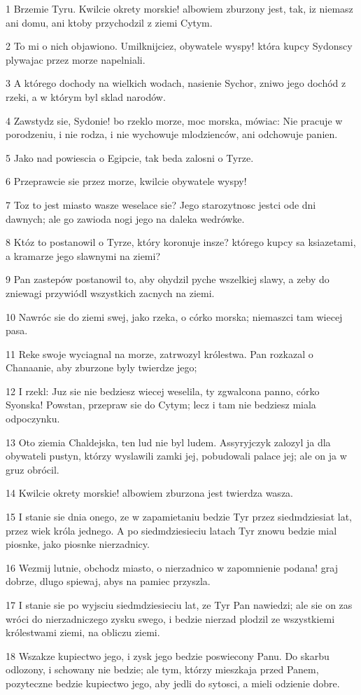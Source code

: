 \par 1 Brzemie Tyru. Kwilcie okrety morskie! albowiem zburzony jest, tak, iz niemasz ani domu, ani ktoby przychodzil z ziemi Cytym.
\par 2 To mi o nich objawiono. Umilknijciez, obywatele wyspy! która kupcy Sydonscy plywajac przez morze napelniali.
\par 3 A którego dochody na wielkich wodach, nasienie Sychor, zniwo jego dochód z rzeki, a w którym byl sklad narodów.
\par 4 Zawstydz sie, Sydonie! bo rzeklo morze, moc morska, mówiac: Nie pracuje w porodzeniu, i nie rodza, i nie wychowuje mlodzienców, ani odchowuje panien.
\par 5 Jako nad powiescia o Egipcie, tak beda zalosni o Tyrze.
\par 6 Przeprawcie sie przez morze, kwilcie obywatele wyspy!
\par 7 Toz to jest miasto wasze weselace sie? Jego starozytnosc jestci ode dni dawnych; ale go zawioda nogi jego na daleka wedrówke.
\par 8 Któz to postanowil o Tyrze, który koronuje insze? którego kupcy sa ksiazetami, a kramarze jego slawnymi na ziemi?
\par 9 Pan zastepów postanowil to, aby ohydzil pyche wszelkiej slawy, a zeby do zniewagi przywiódl wszystkich zacnych na ziemi.
\par 10 Nawróc sie do ziemi swej, jako rzeka, o córko morska; niemaszci tam wiecej pasa.
\par 11 Reke swoje wyciagnal na morze, zatrwozyl królestwa. Pan rozkazal o Chanaanie, aby zburzone byly twierdze jego;
\par 12 I rzekl: Juz sie nie bedziesz wiecej weselila, ty zgwalcona panno, córko Syonska! Powstan, przepraw sie do Cytym; lecz i tam nie bedziesz miala odpoczynku.
\par 13 Oto ziemia Chaldejska, ten lud nie byl ludem. Assyryjczyk zalozyl ja dla obywateli pustyn, którzy wyslawili zamki jej, pobudowali palace jej; ale on ja w gruz obrócil.
\par 14 Kwilcie okrety morskie! albowiem zburzona jest twierdza wasza.
\par 15 I stanie sie dnia onego, ze w zapamietaniu bedzie Tyr przez siedmdziesiat lat, przez wiek króla jednego. A po siedmdziesieciu latach Tyr znowu bedzie mial piosnke, jako piosnke nierzadnicy.
\par 16 Wezmij lutnie, obchodz miasto, o nierzadnico w zapomnienie podana! graj dobrze, dlugo spiewaj, abys na pamiec przyszla.
\par 17 I stanie sie po wyjsciu siedmdziesieciu lat, ze Tyr Pan nawiedzi; ale sie on zas wróci do nierzadniczego zysku swego, i bedzie nierzad plodzil ze wszystkiemi królestwami ziemi, na obliczu ziemi.
\par 18 Wszakze kupiectwo jego, i zysk jego bedzie poswiecony Panu. Do skarbu odlozony, i schowany nie bedzie; ale tym, którzy mieszkaja przed Panem, pozyteczne bedzie kupiectwo jego, aby jedli do sytosci, a mieli odzienie dobre.

